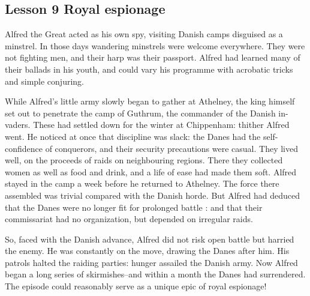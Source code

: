 \documentclass[kindlepaper]{BHCexam4kindle}
\begin{document}
\subsection{Lesson 9
Royal espionage}
\par
Alfred the Great acted as his own spy, visiting Danish camps disguised as a
minstrel. In those days wandering minstrels were welcome everywhere. They
were not fighting men, and their harp was their passport. Alfred had learned
many of their ballads in his youth, and could vary his programme with acrobatic
tricks and simple conjuring.
\par
While Alfred's little army slowly began to gather at Athelney, the king himself
set out to penetrate the camp of Guthrum, the commander of the Danish in-
vaders. These had settled down for the winter at Chippenham: thither Alfred
went. He noticed at once that discipline was slack: the Danes had the self-
confidence of conquerors, and their security precautions were casual. They lived
well, on the proceeds of raids on neighbouring regions. There they collected
women as well as food and drink, and a life of ease had made them soft.
Alfred stayed in the camp a week before he returned to Athelney. The force
there assembled was trivial compared with the Danish horde. But Alfred had
deduced that the Danes were no longer fit for prolonged battle : and that their
commissariat had no organization, but depended on irregular raids.
\par
So, faced with the Danish advance, Alfred did not risk open battle but harried
the enemy. He was constantly on the move, drawing the Danes after him. His
patrols halted the raiding parties: hunger assailed the Danish army. Now Alfred
began a long series of skirmishes--and within a month the Danes had surrendered. The episode could reasonably serve as a unique epic of royal espionage!
\clearpage
\end{document}
